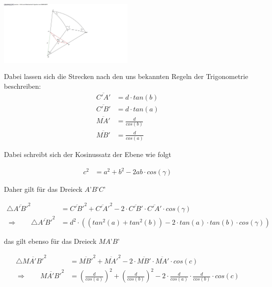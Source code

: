 \begin{refsection}
\begin{center}
        \includegraphics[width=0.5\textwidth]{kugel/1Seintenkosinus.jpg}
\end{center}

Dabei lassen sich die Strecken nach den uns bekannten Regeln der Trigonometrie beschreiben:
\begin{align*}
\overline{C'A'} &= d\cdot {tan(b)} \\
\overline{C'B'} &= d\cdot {tan(a)} \\
\overline{MA'} &= \frac{ d }{cos(b)} \\
\overline{MB'} &= \frac{ d }{cos(a)}
\end{align*} 


Dabei schreibt sich der Kosinussatz der Ebene wie folgt

\begin{align*}
c^{ 2 } &= a^{ 2 } + b^{ 2 } - 2ab \cdot cos(\gamma)
\end{align*}

Daher gilt für das Dreieck $A’B’C’$

\begin{align*}
\triangle \overline{A'B'}^{ 2 } &= \overline{ C'B' }^{ 2 } + \overline{ C'A' }^{ 2 } - 2 \cdot \overline{C'B'} \cdot \overline{ C'A' } \cdot cos(\gamma) \\
\Rightarrow \quad \quad
\triangle \overline{A'B'}^{ 2 } &= d^{ 2 } \cdot \left(\left(tan^{ 2 }(a) + tan^{ 2 }(b)\right) - 2\cdot tan(a) \cdot tan(b) \cdot cos(\gamma)\right)
\end{align*}


das gilt ebenso für das Dreieck $MA’B’$

\begin{align*}
\triangle \overline{ MA'B' }^{ 2 } &= \overline{ MB' }^{ 2 } + \overline{ MA' }^{ 2 } - 2\cdot \overline{ MB'} \cdot \overline{ MA' } \cdot cos(c) \\
\Rightarrow \quad \quad
\overline{ MA'B'}^{ 2 } &= \left(\frac{ d }{ cos(a) }  \right)^{ 2 } + \left(\frac{ d }{ cos(b)}  \right)^{ 2 } - 2 \cdot \frac{ d }{ cos(a)} \cdot \frac{ d }{ cos(b)} \cdot cos(c)
\end{align*}



\end{refsection}

